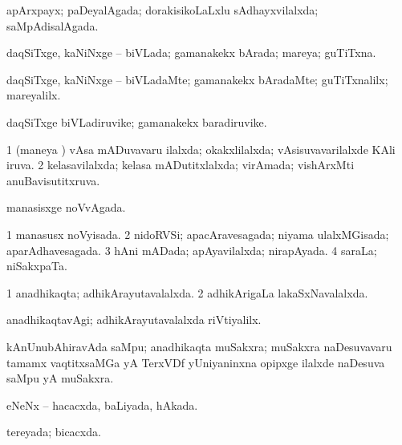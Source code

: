 \bentry
{} 
\gl{\gu}
\expl{}
\bmng
apArxpayx; paDeyalAgada; dorakisikoLaLxlu sAdhayxvilalxda; saMpAdisalAgada. 
\emng
\eentry

\bentry
{} 
\gl{\gu}
\expl{}
\bmng
daqSiTxge, kaNiNxge -- biVLada; gamanakekx bArada; mareya; guTiTxna. 
\emng
\eentry

\bentry
{} 
\gl{\kirxvi}
\expl{}
\bmng
daqSiTxge, kaNiNxge -- biVLadaMte; gamanakekx bAradaMte; guTiTxnalilx; mareyalilx. 
\emng
\eentry

\bentry
{} 
\gl{\nA}
\expl{}
\bmng
daqSiTxge biVLadiruvike; gamanakekx baradiruvike. 
\emng
\eentry

\bentry
{} 
\gl{\gu}
\expl{}
\bmng
\bnum
\num{1} (maneya \vi) vAsa mADuvavaru ilalxda; okakxlilalxda; vAsisuvavarilalxde KAli iruva. 
\num{2} kelasavilalxda; kelasa mADutitxlalxda; virAmada; vishArxMti anuBavisutitxruva. 
\enum
\emng
\eentry

\bentry
{} 
\gl{\gu}
\expl{}
\bmng
manasisxge noVvAgada. 
\emng
\eentry

\bentry
{} 
\gl{\gu}
\expl{}
\bmng
\bnum
\num{1} manasusx noVyisada. 
\num{2} nidoRVSi; apacAravesagada; niyama ulalxMGisada; aparAdhavesagada. 
\num{3} hAni mADada; apAyavilalxda; nirapAyada. 
\num{4} saraLa; niSakxpaTa. 
\enum
\emng
\eentry

\bentry
{} 
\gl{\gu}
\expl{}
\bmng
\bnum
\num{1} anadhikaqta; adhikArayutavalalxda. 
\num{2} adhikArigaLa lakaSxNavalalxda. 
\enum
\emng
\eentry

\bentry
{} 
\gl{\kirxvi}
\expl{}
\bmng
anadhikaqtavAgi; adhikArayutavalalxda riVtiyalilx. 
\emng
\eentry

\bentry
{}
\gl{\nA}
\expl{}
\bmng
kAnUnubAhiravAda saMpu; anadhikaqta muSakxra; muSakxra naDesuvavaru tamamx vaqtitxsaMGa yA TerxVDf yUniyaninxna opipxge ilalxde naDesuva saMpu yA muSakxra. 
\emng
\eentry

\bentry
{} 
\gl{\gu}
\bmng
eNeNx -- hacacxda, baLiyada, hAkada. 
\emng
\eentry

\bentry
{} 
\gl{\gu}
\expl{}
\bmng
tereyada; bicacxda. 
\emng
\eentry

